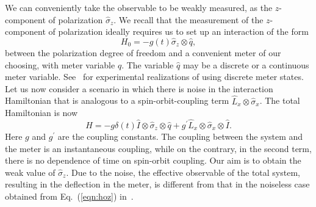 \documentclass[aps,pra,showpacs,twoside,twocolumn,10pt]{revtex4-1}
\newcommand{\stkout}[1]{\ifmmode\text{\sout{\ensuremath{#1}}}\else\sout{#1}\fi}
\begin{document}
We can conveniently take the observable to be weakly measured, as the $z$-component of polarization $\hat{\sigma}_z$.
We  recall that the measurement of the $z$-component of polarization ideally requires us to set up an interaction of the form
\begin{equation}
H_0=-g(t)\hat{\sigma}_z\otimes \hat{q},
\label{eqn:hoz}
\end{equation}
between the polarization degree of freedom and a convenient meter of our choosing, with meter variable $\hat{q}$. The variable $\hat{q}$ may be a discrete or a continuous meter variable. 
See~\cite{Pryde, npj,m, opticsguo} for experimental realizations of using discrete meter states. 
Let us now consider a  scenario in which there is noise in the interaction Hamiltonian that is analogous to a spin-orbit-coupling term $\hat{L}_x \otimes {\hat\sigma}_x$. The total Hamiltonian is now 
\begin{equation}
    H=-g\delta(t)\hat{I} \otimes \hat{\sigma}_z \otimes  \hat{q}+g^{\prime}  \hat{L}_x \otimes \hat{\sigma}_x \otimes \hat{I}.
\label{eq:Hnoisy}    
\end{equation}
Here $g$ and $g^{\prime}$ are the coupling constants. The coupling between the system and the meter is an instantaneous coupling, while on the contrary, in the second term, there is no dependence of time on spin-orbit coupling. Our aim is to obtain the weak value of $\hat{\sigma}_z$. Due to the noise, the effective observable of the total system, resulting in the deflection in the meter, is different from that in the noiseless case obtained from Eq.~(\ref{eqn:hoz}) in~\cite{AAV,Duck}.
\end{document}
